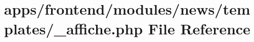 \hypertarget{frontend_2modules_2news_2templates_2__affiche_8php}{\section{apps/frontend/modules/news/templates/\-\_\-affiche.php File Reference}
\label{frontend_2modules_2news_2templates_2__affiche_8php}
}
